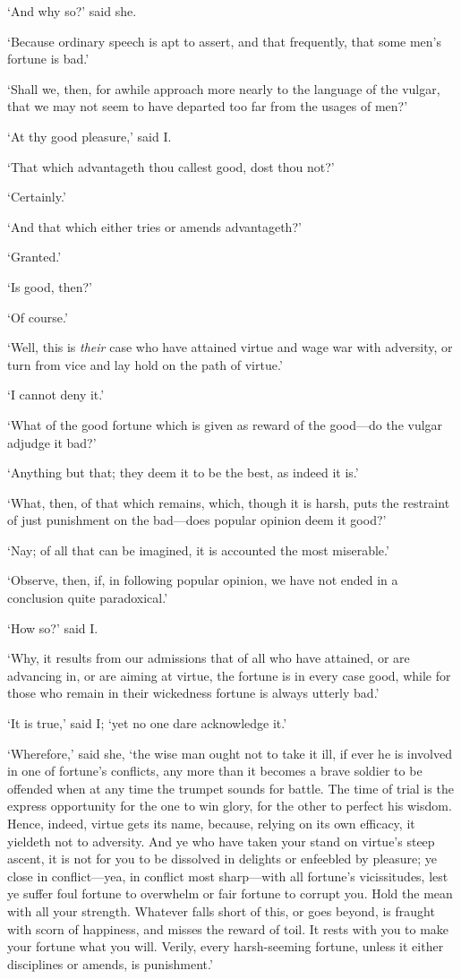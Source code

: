 \documentclass[12pt]{book}
\begin{document}
`And why so?' said she.

`Because ordinary speech is apt to assert, and that frequently, that
some men's fortune is bad.'

`Shall we, then, for awhile approach more nearly to the language of the
vulgar, that we may not seem to have departed too far from the usages of
men?'

`At thy good pleasure,' said I.

`That which advantageth thou callest good, dost thou not?'

`Certainly.'

`And that which either tries or amends advantageth?'

`Granted.'

`Is good, then?'

`Of course.'

`Well, this is \emph{their} case who have attained virtue and wage war with
adversity, or turn from vice and lay hold on the path of virtue.'

`I cannot deny it.'

`What of the good fortune which is given as reward of the good---do the
vulgar adjudge it bad?'

`Anything but that; they deem it to be the best, as indeed it is.'

`What, then, of that which remains, which, though it is harsh, puts the
restraint of just punishment on the bad---does popular opinion deem it
good?'

`Nay; of all that can be imagined, it is accounted the most miserable.'

`Observe, then, if, in following popular opinion, we have not ended in a
conclusion quite paradoxical.'

`How so?' said I.

`Why, it results from our admissions that of all who have attained, or
are advancing in, or are aiming at virtue, the fortune is in every case
good, while for those who remain in their wickedness fortune is always
utterly bad.'

`It is true,' said I; `yet no one dare acknowledge it.'

`Wherefore,' said she, `the wise man ought not to take it ill, if ever
he is involved in one of fortune's conflicts, any more than it becomes a
brave soldier to be offended when at any time the trumpet sounds for
battle. The time of trial is the express opportunity for the one to win
glory, for the other to perfect his wisdom. Hence, indeed, virtue gets
its name, because, relying on its own efficacy, it yieldeth not to
adversity. And ye who have taken your stand on virtue's steep ascent,
it is not for you to be dissolved in delights or enfeebled by pleasure;
ye close in conflict---yea, in conflict most sharp---with all fortune's
vicissitudes, lest ye suffer foul fortune to overwhelm or fair fortune
to corrupt you. Hold the mean with all your strength. Whatever falls
short of this, or goes beyond, is fraught with scorn of happiness, and
misses the reward of toil. It rests with you to make your fortune what
you will. Verily, every harsh-seeming fortune, unless it either
disciplines or amends, is punishment.'
\end{document}
